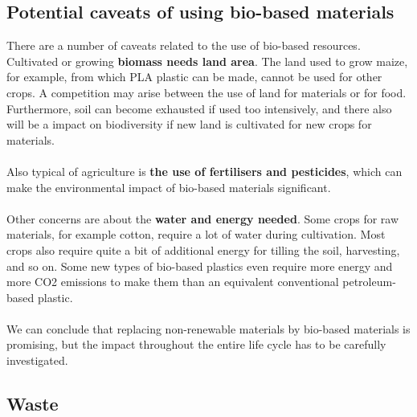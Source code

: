 \documentclass[../summary.tex]{subfiles}
\begin{document}
	\subsection{Potential caveats of using bio-based materials}
	
	There are a number of caveats related to the use of bio-based resources. Cultivated or growing \textbf{biomass needs land area}. The land used to grow maize, for example, from which PLA plastic can be made, cannot be used for other crops. A competition may arise between the use of land for materials or for food. Furthermore, soil can become exhausted if used too intensively, and there also will be a impact on biodiversity if new land is cultivated for new crops for materials. 
	\\\\
	Also typical of agriculture is \textbf{the use of fertilisers and pesticides}, which can make the environmental impact of bio-based materials significant.
	\\\\
	Other concerns are about the \textbf{water and energy needed}. Some crops for raw materials, for example cotton, require a lot of water during cultivation. Most crops also require quite a bit of additional energy for tilling the soil, harvesting, and so on. Some new types of bio-based plastics even require more energy and more CO2 emissions to make them than an equivalent conventional petroleum-based plastic. 
	\\\\
	We can conclude that replacing non-renewable materials by bio-based materials is promising, but the impact throughout the entire life cycle has to be carefully investigated.
	
	\subsection{Waste}
	
\end{document}

